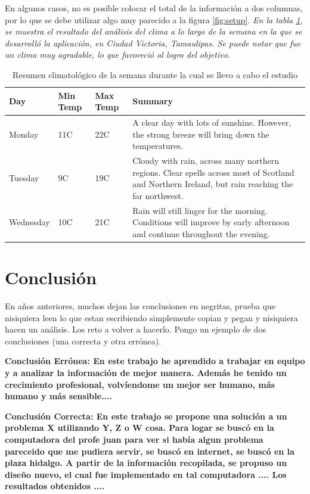 \documentclass[conference]{IEEEtran}
\begin{document}
En algunos casos, no es posible colocar el total de la información a dos columnas, por lo que se debe utilizar algo muy parecido a la figura \ref{fig:setup}. \textit{En la tabla \ref{tabla2}, se muestra el resultado del análisis del clima a lo largo de la semana en la que se desarrolló la aplicación, en Ciudad Victoria, Tamaulipas. Se puede notar que fue un clima muy agradable, lo que favoreció al logro del objetivo.}

\begin{table}[h!]
  \centering
  \caption{Resumen climatológico de la semana durante la cual se llevo a cabo el estudio}
    \begin{tabular}{ | l | l | l | p{5cm} |}
    \hline
    Day & Min Temp & Max Temp & Summary \\ \hline
    Monday & 11C & 22C & A clear day with lots of sunshine.  
    However, the strong breeze will bring down the temperatures. \\ \hline
    Tuesday & 9C & 19C & Cloudy with rain, across many northern regions. Clear spells 
    across most of Scotland and Northern Ireland, 
    but rain reaching the far northwest. \\ \hline
    Wednesday & 10C & 21C & Rain will still linger for the morning. 
    Conditions will improve by early afternoon and continue 
    throughout the evening. \\
    \hline
    \end{tabular}
    \label{tabla2}
\end{table}


\section{Conclusión}

En años anteriores, muchos dejan las conclusiones en negritas, prueba que nisiquiera leen lo que estan escribiendo simplemente copian y pegan y nisiquiera hacen un análisis. Los reto a volver a hacerlo. Pongo un ejemplo de dos conclusiones (una correcta y otra errónea).

\textbf{Conclusión Errónea: En este trabajo he aprendido a trabajar en equipo y a analizar la información de mejor manera. Además he tenido un crecimiento profesional, volvíendome un mejor ser humano, más humano y más sensible.... }

\textbf{Conclusión Correcta: En este trabajo se propone una solución a un problema X utilizando Y, Z o W cosa. Para logar se buscó en la computadora del profe juan para ver si había algun problema pareceido que me pudiera servir, se buscó en internet, se buscó en la plaza hidalgo. A partir de la información recopilada, se propuso un diseño nuevo, el cual fue implementado en tal computadora ....  Los resultados obtenidos ....}
\end{document}
